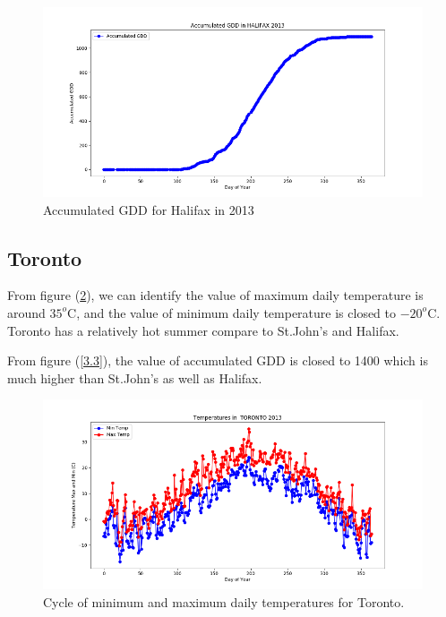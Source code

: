 \documentclass[12pt]{article}
\begin{document}
\begin{figure}[H]
\includegraphics[width=5.25in]{Plot/halifax.png}



\caption{Accumulated GDD for Halifax in 2013}
\label{2.2}
\end{figure}






\subsection{ \bf Toronto }



From figure (\ref{3}), we can identify the value of maximum daily temperature is around $35^{o}$C, and the value of minimum daily temperature is closed to $-20^{o}$C. Toronto has a relatively hot summer compare to St.John's and Halifax. 

From figure (\ref{3.3}), the value of accumulated GDD is closed to 1400 which is much higher than St.John's as well as Halifax.

\begin{center}
\begin{figure}[H]
\includegraphics[width=5.25in]{Plot/Toronto/day_vs_temp_2013.png}



\caption{Cycle of minimum and maximum daily temperatures for Toronto.}
\label{3}
\end{figure}
\end{center}
\end{document}
